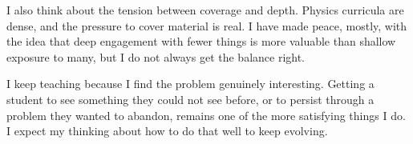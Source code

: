 \documentclass[10pt]{article}
\begin{document}
I also think about the tension between coverage and depth. Physics curricula are dense, and
the pressure to cover material is real. I have made peace, mostly, with the idea that deep
engagement with fewer things is more valuable than shallow exposure to many, but I do not
always get the balance right.

I keep teaching because I find the problem genuinely interesting. Getting a student to see
something they could not see before, or to persist through a problem they wanted to abandon,
remains one of the more satisfying things I do. I expect my thinking about how to do that well
to keep evolving.

\end{document}
